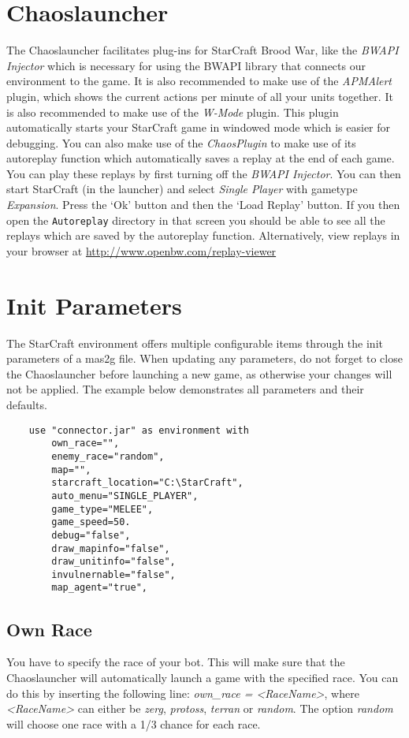 \section{Chaoslauncher}
The Chaoslauncher facilitates plug-ins for StarCraft Brood War, like the \textit{BWAPI Injector} which is necessary for using the BWAPI library that connects our environment to the game. It is also recommended to make use of the \textit{APMAlert} plugin, which shows the current actions per minute of all your units together. It is also recommended to make use of the \textit{W-Mode} plugin. This plugin automatically starts your StarCraft game in windowed mode which is easier for debugging. You can also make use of the \textit{ChaosPlugin} to make use of its autoreplay function which automatically saves a replay at the end of each game. You can play these replays by first turning off the \textit{BWAPI Injector}. You can then start StarCraft (in the launcher) and select \textit{Single Player} with gametype \textit{Expansion}. Press the `Ok' button and then the `Load Replay' button. If you then open the \texttt{Autoreplay} directory in that screen you should be able to see all the replays which are saved by the autoreplay function.  Alternatively, view replays in your browser at \url{http://www.openbw.com/replay-viewer}

\section{Init Parameters}
\label{mas2g}
The StarCraft environment offers multiple configurable items through the init parameters of a mas2g file. When updating any parameters, do not forget to close the Chaoslauncher before launching a new game, as otherwise your changes will not be applied. The example below demonstrates all parameters and their defaults.

\begin{verbatim}
    use "connector.jar" as environment with
        own_race="",
        enemy_race="random",
        map="",
        starcraft_location="C:\StarCraft",
        auto_menu="SINGLE_PLAYER",
        game_type="MELEE",
        game_speed=50.
        debug="false",
        draw_mapinfo="false",
        draw_unitinfo="false",
        invulnernable="false",
        map_agent="true",
\end{verbatim}

\subsection{Own Race}
\label{own race}
You have to specify the race of your bot. This will make sure that the Chaoslauncher will automatically launch a game with the specified race. You can do this by inserting the following line: \textit{own\_race = <RaceName>}, where \textit{<RaceName>} can either be \textit{zerg}, \textit{protoss}, \textit{terran} or \textit{random}. The option \textit{random} will choose one race with a 1/3 chance for each race.

